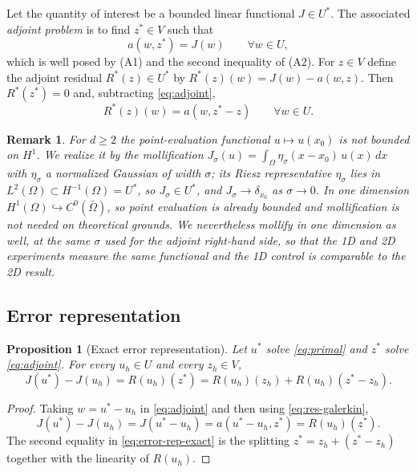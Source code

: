 \documentclass[preprint,11pt]{elsarticle}
\newtheorem{proposition}[theorem]{Proposition}
\newtheorem{remark}[theorem]{Remark}
\begin{document}
Let the quantity of interest be a bounded linear functional $J \in U^*$. The associated \emph{adjoint problem} is to find $z^* \in V$ such that
\begin{equation}
  \label{eq:adjoint}
  a(w, z^*) = J(w) \qquad \forall w \in U,
\end{equation}
which is well posed by (A1) and the second inequality of (A2). For $z \in V$ define the adjoint residual $R^*(z) \in U^*$ by $R^*(z)(w) = J(w) - a(w, z)$. Then $R^*(z^*) = 0$ and, subtracting \eqref{eq:adjoint},
\begin{equation}
  \label{eq:adj-res-galerkin}
  R^*(z)(w) = a(w, z^* - z) \qquad \forall w \in U .
\end{equation}

\begin{remark}
For $d \geq 2$ the point-evaluation functional $u \mapsto u(x_0)$ is not bounded on $H^1$. We realize it by the mollification $J_\sigma(u) = \int_\Omega \eta_\sigma(x - x_0)\, u(x)\, dx$ with $\eta_\sigma$ a normalized Gaussian of width $\sigma$; its Riesz representative $\eta_\sigma$ lies in $L^2(\Omega) \subset H^{-1}(\Omega) = U^*$, so $J_\sigma \in U^*$, and $J_\sigma \to \delta_{x_0}$ as $\sigma \to 0$. In one dimension $H^1(\Omega) \hookrightarrow C^0(\bar{\Omega})$, so point evaluation is already bounded and mollification is not needed on theoretical grounds. We nevertheless mollify in one dimension as well, at the same $\sigma$ used for the adjoint right-hand side, so that the 1D and 2D experiments measure the same functional and the 1D control is comparable to the 2D result.
\end{remark}

\subsection{Error representation}

\begin{proposition}[Exact error representation]
\label{prop:error-rep}
Let $u^*$ solve \eqref{eq:primal} and $z^*$ solve \eqref{eq:adjoint}. For every $u_h \in U$ and every $z_h \in V$,
\begin{equation}
  \label{eq:error-rep-exact}
  J(u^*) - J(u_h) = R(u_h)(z^*) = R(u_h)(z_h) + R(u_h)(z^* - z_h).
\end{equation}
\end{proposition}

\begin{proof}
Taking $w = u^* - u_h$ in \eqref{eq:adjoint} and then using \eqref{eq:res-galerkin},
\begin{equation*}
  J(u^*) - J(u_h) = J(u^* - u_h) = a(u^* - u_h, z^*) = R(u_h)(z^*).
\end{equation*}
The second equality in \eqref{eq:error-rep-exact} is the splitting $z^* = z_h + (z^* - z_h)$ together with the linearity of $R(u_h)$.
\end{proof}
\end{document}
